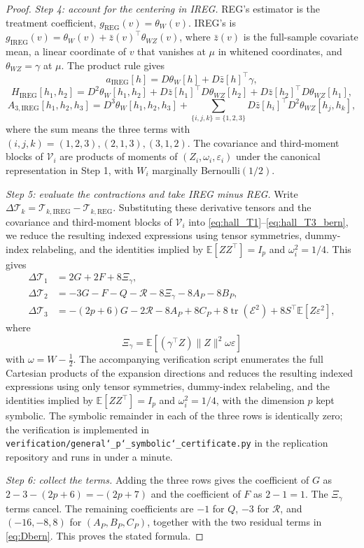 \documentclass{article}
\newcommand{\EEE}{\mathbb{E}}
\DeclareMathOperator{\tr}{tr}
\newcommand{\IREG}{\mathrm{IREG}}
\newcommand{\REG}{\mathrm{REG}}
\theoremstyle{plain}
\theoremstyle{definition}
\theoremstyle{remark}
\begin{document}
\begin{proof}
\emph{Step 4: account for the centering in IREG.}
REG's estimator is the treatment coefficient,
$g_\REG(v)=\theta_W(v)$. IREG's is
$g_\IREG(v)=\theta_W(v)+\bar z(v)^\top\theta_{WZ}(v)$, where
$\bar z(v)$ is the full-sample covariate mean, a linear coordinate of
$v$ that vanishes at $\mu$ in whitened coordinates, and $\theta_{WZ}=\gamma$ at $\mu$. The product rule gives
\[
a_\IREG[h]
=
D\theta_W[h]+D\bar z[h]^\top\gamma,
\]
\[
H_\IREG[h_1,h_2]
=
D^2\theta_W[h_1,h_2]
+
D\bar z[h_1]^\top D\theta_{WZ}[h_2]
+
D\bar z[h_2]^\top D\theta_{WZ}[h_1],
\]
\[
A_{3,\IREG}[h_1,h_2,h_3]
=
D^3\theta_W[h_1,h_2,h_3]
+
\sum_{\{i,j,k\}=\{1,2,3\}}
D\bar z[h_i]^\top D^2\theta_{WZ}[h_j,h_k],
\]
where the sum means the three terms with
$(i,j,k)=(1,2,3),(2,1,3),(3,1,2)$. The covariance and
third-moment blocks of $\mathcal V_i$ are products of moments of
$(Z_i,\omega_i,\varepsilon_i)$ under the canonical representation in
Step 1, with $W_i$ marginally Bernoulli$(1/2)$.

\emph{Step 5: evaluate the contractions and take IREG minus REG.}
Write $\Delta\mathcal T_k=\mathcal T_{k,\IREG}-\mathcal T_{k,\REG}$.
Substituting these derivative tensors and the covariance and third-moment blocks of $\mathcal V_i$ into \eqref{eq:hall_T1}--\eqref{eq:hall_T3_bern}, we reduce the resulting indexed expressions using tensor symmetries, dummy-index relabeling, and the identities implied by $\EEE[ZZ^\top]=I_p$ and $\omega_i^2=1/4$. This gives
\begin{align}
\Delta\mathcal T_1
&=
2G+2F+8\Xi_\gamma,
\label{eq:dT1}
\\
\Delta\mathcal T_2
&=
-3G-F-Q-\mathcal R-8\Xi_\gamma-8A_P-8B_P,
\label{eq:dT2}
\\
\Delta\mathcal T_3
&=
-(2p+6)G-2\mathcal R-8A_P+8C_P
+8\tr(\mathcal E^2)
+8S^\top \EEE[Z\varepsilon^2],
\label{eq:dT3}
\end{align}
where
\[
\Xi_\gamma
=
\EEE[(\gamma^\top Z)\|Z\|^2\omega\varepsilon]
\]
with $\omega=W-\frac12$. The accompanying verification script
enumerates the full Cartesian products of the expansion directions and
reduces the resulting indexed expressions using only tensor symmetries, dummy-index relabeling, and the identities implied by
$\EEE[ZZ^\top]=I_p$ and $\omega_i^2=1/4$, with the dimension $p$ kept
symbolic. The symbolic remainder in each of the three rows is
identically zero; the verification is implemented in
\texttt{verification/general\char`\_p\char`\_symbolic\char`\_certificate.py} in the replication repository and runs in under a minute.

\emph{Step 6: collect the terms.}
Adding the three rows gives the coefficient of $G$ as
$2-3-(2p+6)=-(2p+7)$ and the coefficient of $F$ as $2-1=1$.
The $\Xi_\gamma$ terms cancel. The remaining coefficients are $-1$
for $Q$, $-3$ for $\mathcal R$, and $(-16,-8,8)$ for
$(A_P,B_P,C_P)$, together with the two residual terms in
\eqref{eq:Dbern}. This proves the stated formula.


\end{proof}
\end{document}
